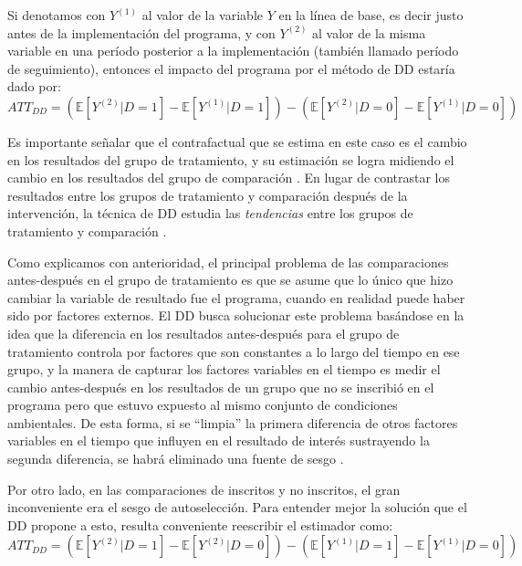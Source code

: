 \documentclass[../../main.tex]{subfiles}
\begin{document}
Si denotamos con \(Y^{(1)}\) al valor de la variable \(Y\) en la línea de base, es decir justo
antes de la implementación del programa, y con \(Y^{(2)}\) al valor de la misma variable en
una período posterior a la implementación (también llamado período de seguimiento),
entonces el impacto del programa por el método de DD estaría dado por:
\begin{equation}
    ATT_{DD} =
        \left(
            \mathbb{E}\left[Y^{(2)}|D=1\right] - \mathbb{E}\left[Y^{(1)}|D=1\right]
        \right) -
        \left(
            \mathbb{E}\left[Y^{(2)}|D=0\right] - \mathbb{E}\left[Y^{(1)}|D=0\right]
        \right)
        \label{eq:dif-en-dif-1}
\end{equation}

Es importante señalar que el contrafactual que se estima en este caso es el cambio en los
resultados del grupo de tratamiento, y su estimación se logra midiendo el cambio en los
resultados del grupo de comparación \cite{gertler-2016}. En lugar de contrastar los
resultados entre los grupos de tratamiento y comparación después de la intervención, la
técnica de DD estudia las \textit{tendencias} entre los grupos de tratamiento y comparación
\cite{gertler-2016}.

Como explicamos con anterioridad, el principal problema de las comparaciones antes-después
en el grupo de tratamiento es que se asume que lo único que hizo cambiar la variable de
resultado fue el programa, cuando en realidad puede haber sido por factores externos. El
DD busca solucionar este problema basándose en la idea que la diferencia en los resultados
antes-después para el grupo de tratamiento controla por factores que son constantes a lo
largo del tiempo en ese grupo, y la manera de capturar los factores variables en el tiempo
es medir el cambio antes-después en los resultados de un grupo que no se inscribió en el
programa pero que estuvo expuesto al mismo conjunto de condiciones ambientales. De esta
forma, si se ``limpia'' la primera diferencia de otros factores variables en el tiempo que
influyen en el resultado de interés sustrayendo la segunda diferencia, se habrá eliminado
una fuente de sesgo \cite{gertler-2016}.

Por otro lado, en las comparaciones de inscritos y no inscritos, el gran inconveniente era
el sesgo de autoselección. Para entender mejor la solución que el DD propone a esto,
resulta conveniente reescribir el estimador como:
\begin{equation}
    ATT_{DD} =
        \left(
            \mathbb{E}\left[Y^{(2)}|D=1\right] - \mathbb{E}\left[Y^{(2)}|D=0\right]
        \right) -
        \left(
            \mathbb{E}\left[Y^{(1)}|D=1\right] - \mathbb{E}\left[Y^{(1)}|D=0\right]
        \right)
        \label{eq:dif-en-dif-2}
\end{equation}
\end{document}
